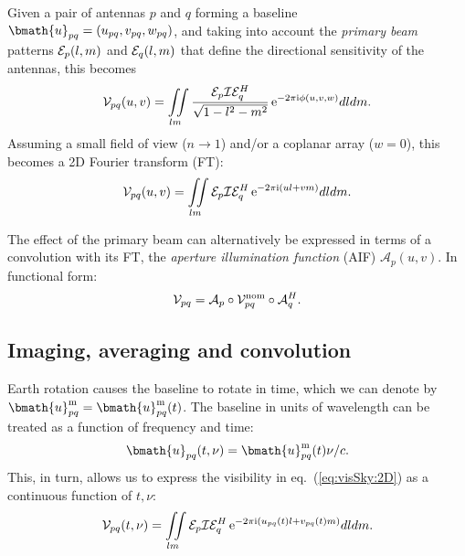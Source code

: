 \documentclass[useAMS,usenatbib]{mn2e}
\newcommand{\ee}{\mathrm{e}}
\newcommand{\ii}{\mathrm{i}}
\begin{document}
Given a pair of antennas $p$ and $q$ forming a baseline $\bmath{u}_{pq}=(u_{pq},v_{pq},w_{pq})$, 
and taking into account the \emph{primary beam} patterns $\mathcal{E}_p(l,m)$ and $\mathcal{E}_q(l,m)$ that define the directional sensitivity of 
the antennas, this becomes 
\begin{equation}
\VV_{pq}(u,v)=\iint\limits_{lm} \frac{\EE_p \II \EE_q^H}{\sqrt{1-l^2 - m^2}}\,\ee^{-2\pi\ii\phi (u,v,w)}dldm. \label{eq:visSky}
\end{equation} 
Assuming a small field of view ($n\to 1$) and/or a coplanar array ($w=0$), this becomes a 2D Fourier transform (FT):
\begin{equation}
\VV_{pq}(u,v)=\iint\limits_{lm} \EE_p \II \EE_q^H\,\ee^{-2\pi\ii(ul+vm)}dldm. \label{eq:visSky:2D}
\end{equation} 


The effect of the primary beam can alternatively be expressed in terms of a convolution with its FT, the \emph{aperture 
illumination function} (AIF) $\mathcal{A}_p(u,v)$. In functional form:
\begin{equation}
\mathcal{V}_{pq} = \mathcal{A}_p \circ \mathcal{V}^\mathrm{nom}_{pq} \circ \mathcal{A}_q^H.\label{eq:visSky:conv}
\end{equation} 



\subsection{Imaging, averaging and convolution}

\label{sec:AvgCon}
Earth rotation causes the baseline to rotate in time, which we can denote by
$\bmath{u}^\mathrm{m}_{pq}=\bmath{u}^\mathrm{m}_{pq}(t)$. The baseline in units of wavelength 
can be treated as a function of frequency and time:
\begin{equation}
\label{eq:uvtf}
\bmath{u}_{pq}(t,\nu) = \bmath{u}^\mathrm{m}_{pq}(t)\nu/c.
\end{equation} 
This, in turn, allows us to express the visibility in eq.~(\ref{eq:visSky:2D}) as 
a continuous function of $t,\nu$:
\begin{equation}
\VV_{pq}(t,\nu)=\iint\limits_{lm} \EE_p \II \EE_q^H\,\ee^{-2\pi\ii(u_{pq}(t)l+v_{pq}(t)m)}dldm. 
\label{eq:visSky:2Dtf}
\end{equation} 
\end{document}
